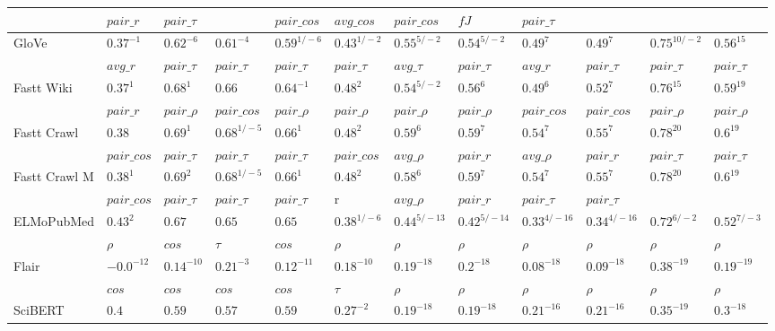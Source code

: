 \documentclass[letterpaper]{article} %
\begin{document}
\begin{table}
\begin{adjustbox}{angle=90}
\begin{tabular}{l l l l l l l l l l l l}
 & $pair\_r$ & $pair\_\tau$ &  & $pair\_cos$ & $avg\_cos$ & $pair\_cos$ & $fJ$ & $pair\_\tau$ \\
\midrule
GloVe & $0.37^{-1}$ & $0.62^{-6}$ & $0.61^{-4}$ & $0.59^{1/-6}$ & $0.43^{1/-2}$ & $0.55^{5/-2}$ & $0.54^{5/-2}$ & $0.49^{7}$ & $0.49^{7}$ & $0.75^{10/-2}$ & $0.56^{15}$ \\
& $avg\_r$ & $pair\_\tau$ & $pair\_\tau$ & $pair\_\tau$ & $pair\_\tau$ & $avg\_\tau$ & $pair\_\tau$ & $avg\_r$ & $pair\_\tau$ & $pair\_\tau$ & $pair\_\tau$ \\
Fastt Wiki & $0.37^{1}$ & $0.68^{1}$ & $0.66$ & $0.64^{-1}$ & $0.48^{2}$ & $0.54^{5/-2}$ & $0.56^{6}$ & $0.49^{6}$ & $0.52^{7}$ & $0.76^{15}$ & $0.59^{19}$ \\
 & $pair\_r$ & $pair\_\rho$ & $pair\_cos$ & $pair\_\rho$ & $pair\_\rho$ & $pair\_\rho$ & $pair\_\rho$ & $pair\_cos$ & $pair\_cos$ & $pair\_\rho$ & $pair\_\rho$ \\
Fastt Crawl & $0.38$ & $0.69^{1}$ & $0.68^{1/-5}$ & $0.66^{1}$ & $0.48^{2}$ & $0.59^{6}$ & $0.59^{7}$ & $0.54^{7}$ & $0.55^{7}$ & $0.78^{20}$ & $0.6^{19}$ \\
 & $pair\_cos$ & $pair\_\tau$ & $pair\_\tau$ & $pair\_\tau$ & $pair\_cos$ & $avg\_\rho$ & $pair\_r$ & $avg\_\rho$ & $pair\_r$ & $pair\_\tau$ & $pair\_\tau$ \\
Fastt Crawl M & $0.38^{1}$ & $0.69^{2}$ & $0.68^{1/-5}$ & $0.66^{1}$ & $0.48^{2}$ & $0.58^{6}$ & $0.59^{7}$ & $0.54^{7}$ & $0.55^{7}$ & $0.78^{20}$ & $0.6^{19}$ \\
 & $pair\_cos$ & $pair\_\tau$ & $pair\_\tau$ & $pair\_\tau$ & r & $avg\_\rho$ & $pair\_r$ & $pair\_\tau$ & $pair\_\tau$ \\
\midrule
ELMoPubMed & $0.43^{2}$ & $0.67$ & $0.65$ & $0.65$ & $0.38^{1/-6}$ & $0.44^{5/-13}$ & $0.42^{5/-14}$ & $0.33^{4/-16}$ & $0.34^{4/-16}$ & $0.72^{6/-2}$ & $0.52^{7/-3}$ \\
 & $\rho$ & $cos$ & $\tau$ & $cos$ & $\rho$ & $\rho$ & $\rho$ & $\rho$ & $\rho$ & $\rho$ & $\rho$ \\
Flair & $-0.0^{-12}$ & $0.14^{-10}$ & $0.21^{-3}$ & $0.12^{-11}$ & $0.18^{-10}$ & $0.19^{-18}$ & $0.2^{-18}$ & $0.08^{-18}$ & $0.09^{-18}$ & $0.38^{-19}$ & $0.19^{-19}$ \\
 & $cos$ & $cos$ & $cos$ & $cos$ & $\tau$ & $\rho$ & $\rho$ & $\rho$ & $\rho$ & $\rho$ & $\rho$ \\
SciBERT & $0.4$ & $0.59$ & $0.57$ & $0.59$ & $0.27^{-2}$ & $0.19^{-18}$ & $0.19^{-18}$ & $0.21^{-16}$ & $0.21^{-16}$ & $0.35^{-19}$ & $0.3^{-18}$ \\

\end{tabular}
\end{adjustbox}
\end{table}
\end{document}
